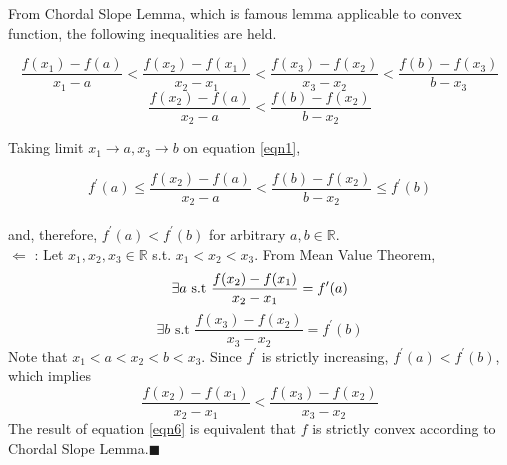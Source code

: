 \documentclass[10pt]{article}
\begin{document}
From Chordal Slope Lemma, which is famous lemma applicable to convex function, the following inequalities are held.

\begin{equation}
    \frac{f(x_1) - f(a)}{x_1 - a} < \frac{f(x_2) - f(x_1)}{x_2 - x_1}<\frac{f(x_3) - f(x_2)}{x_3 - x_2} < \frac{f(b) - f(x_3)}{b - x_3}
    \label{eqn1}
\end{equation} 
\begin{equation}
    \frac{f(x_2) - f(a)}{x_2 - a} < \frac{f(b) - f(x_2)}{b - x_2}
\end{equation} 

Taking limit $x_1 \rightarrow a, x_3 \rightarrow b$ on equation \ref{eqn1}, 

\begin{equation}
    f^\prime(a) \le \frac{f(x_2) - f(a)}{x_2 - a} < \frac{f(b) - f(x_2)}{b - x_2} \le f^\prime(b)
\end{equation}\\
and, therefore, $f^\prime(a)<f^\prime(b)$ for arbitrary $a,b\in\mathbb{R}$.\\

$\Longleftarrow$ : Let $x_1, x_2, x_3 \in \mathbb{R}$ s.t. $x_1<x_2<x_3$. From Mean Value Theorem,
\begin{equation}
    \exists a \text{ s.t } \frac{f(x_2) - f(x_1)}{x_2 - x_1} = f^\prime(a) \\
\end{equation}
\begin{equation}
    \exists b \text{ s.t } \frac{f(x_3) - f(x_2)}{x_3 - x_2} = f^\prime(b)
\end{equation}
Note that $x_1<a<x_2<b<x_3$. Since $f^\prime$ is strictly increasing, $f^\prime(a) < f^\prime(b)$, which implies 
\begin{equation}
    \frac{f(x_2) - f(x_1)}{x_2 - x_1} < \frac{f(x_3) - f(x_2)}{x_3 - x_2} 
    \label{eqn6}
\end{equation}
The result of equation \ref{eqn6} is equivalent that $f$ is strictly convex according to Chordal Slope Lemma.$\blacksquare$ 
\end{document}
